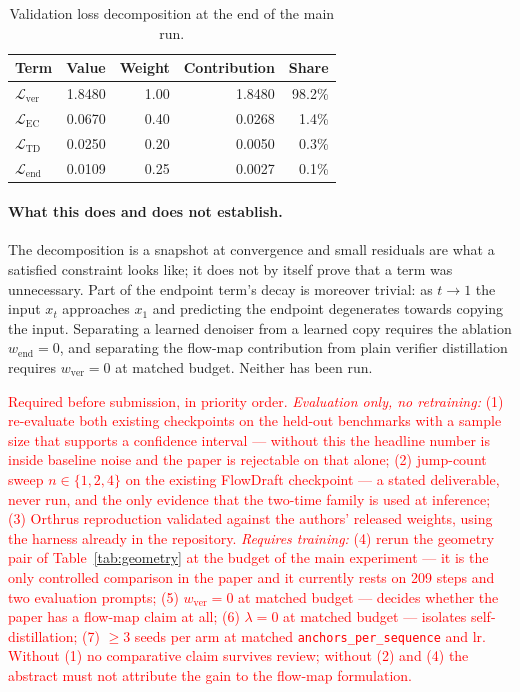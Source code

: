 \documentclass{zapiski}
\newcommand{\cm}[1]{\textcolor{red}{#1}}
\begin{document}
\begin{table}[!tbh]
\centering
\begin{tabular}{lrrrr}
\toprule
Term & Value & Weight & Contribution & Share \\
\midrule
$\mathcal{L}_{\mathrm{ver}}$ & 1.8480 & 1.00 & 1.8480 & 98.2\% \\
$\mathcal{L}_{\mathrm{EC}}$  & 0.0670 & 0.40 & 0.0268 & 1.4\% \\
$\mathcal{L}_{\mathrm{TD}}$  & 0.0250 & 0.20 & 0.0050 & 0.3\% \\
$\mathcal{L}_{\mathrm{end}}$ & 0.0109 & 0.25 & 0.0027 & 0.1\% \\
\bottomrule
\end{tabular}
\caption{Validation loss decomposition at the end of the main run.}
\label{tab:decomp}
\end{table}

\paragraph{What this does and does not establish.} The decomposition is a
snapshot at convergence and small residuals are what a satisfied constraint
looks like; it does not by itself prove that a term was unnecessary. Part of
the endpoint term's decay is moreover trivial: as $t \to 1$ the input $x_t$
approaches $x_1$ and predicting the endpoint degenerates towards copying the
input. Separating a learned denoiser from a learned copy requires the ablation
$w_{\mathrm{end}} = 0$, and separating the flow-map contribution from plain
verifier distillation requires $w_{\mathrm{ver}} = 0$ at matched budget.
Neither has been run.

\cm{Required before submission, in priority order.
\emph{Evaluation only, no retraining:}
(1) re-evaluate both existing checkpoints on the held-out benchmarks with a
sample size that supports a confidence interval --- without this the headline
number is inside baseline noise and the paper is rejectable on that alone;
(2) jump-count sweep $n \in \{1,2,4\}$ on the existing FlowDraft checkpoint ---
a stated deliverable, never run, and the only evidence that the two-time family
is used at inference;
(3) Orthrus reproduction validated against the authors' released weights, using
the harness already in the repository.
\emph{Requires training:}
(4) rerun the geometry pair of Table~\ref{tab:geometry} at the budget of the
main experiment --- it is the only controlled comparison in the paper and it
currently rests on 209 steps and two evaluation prompts;
(5) $w_{\mathrm{ver}} = 0$ at matched budget --- decides whether the paper has a
flow-map claim at all;
(6) $\lambda = 0$ at matched budget --- isolates self-distillation;
(7) $\ge 3$ seeds per arm at matched \texttt{anchors\_per\_sequence} and lr.
Without (1) no comparative claim survives review; without (2) and (4) the
abstract must not attribute the gain to the flow-map formulation.}
\end{document}
